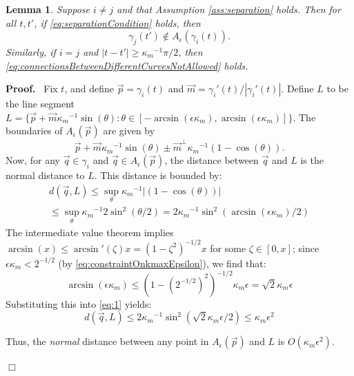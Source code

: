 \documentclass{article}
\newcommand{\nin}{\not\in}
\newenvironment{proof}{
  \noindent\textbf{Proof.}\ }{\hspace*{\fill}
  \begin{math}\Box\end{math}\medskip}
\newtheorem{lemma}[cntr]{Lemma}
\numberwithin{cntr}{section}
\numberwithin{equation}{section}
\newcommand{\abs}[1]{\left| #1 \right|}%
\newcommand{\vp}[0]{{\vec{p}}}
\newcommand{\vq}[0]{{\vec{q}}}
\newcommand{\vm}[0]{{\vec{m}}}
\newcommand{\allowed}[2]{ { A_{#1}(#2) } }
\newcommand{\curvemax}{{\kappa_{m}}}
\newcommand{\curvemaxi}{{\curvemax^{-1}}}
\begin{document}
\begin{lemma}
  \label{lem:separationAllowedRegions}
  Suppose $i \neq j$ and that Assumption \ref{ass:separation} holds.
Then for all $t, t'$, if \eqref{eq:separationCondition} holds, then
  \begin{equation}
    \label{eq:connectionsBetweenDifferentCurvesNotAllowed}
    \gamma_{j}(t')  \nin  \allowed{\epsilon}{\gamma_{i}(t)}.
  \end{equation}
  Similarly, if $i=j$ and $\abs{t-t'} \geq \curvemax^{-1} \pi/2$, then \eqref{eq:connectionsBetweenDifferentCurvesNotAllowed} holds.
\end{lemma}
\begin{proof}
  Fix $t$, and define $\vp=\gamma_{i}(t)$ and $\vm=\gamma_{i}'(t) / \abs{\gamma_{i}'(t)}$. Define $L$ to be the line segment $L= \{ \vp+\vm \curvemaxi \sin(\theta) : \theta \in [-\arcsin(\epsilon \curvemax),\arcsin(\epsilon \curvemax)] \}$. The boundaries of $\allowed{\epsilon}{\vp}$ are given by
\begin{equation*}
  \vp + \vm \curvemaxi \sin(\theta) \pm \vm^{\perp} \curvemaxi (1-\cos(\theta)).
\end{equation*}
Now, for any $\vq \in \gamma_{i} $ and $\vq \in \allowed{\epsilon}{\vp}$, the distance between $\vq$ and $L$ is the normal distance to $L$. This distance is bounded by:
\begin{multline}
  \label{eq:1}
  d(\vq,L) \leq
  \sup_{\theta} \curvemaxi \abs{(1-\cos(\theta)) }\\
  \leq
  \sup_{\theta} \curvemaxi 2 \sin^{2}(\theta/2) =
  2\curvemaxi \sin^{2}( \arcsin(\epsilon \curvemax)/2)
\end{multline}
The intermediate value theorem implies $\arcsin( x) \leq \arcsin'(\zeta) x=(1-\zeta^{2})^{-1/2} x$ for some $\zeta \in [0,x]$; since $\epsilon \curvemax < 2^{-1/2}$ (by \eqref{eq:constraintOnkmaxEpsilon}), we find that:
\begin{equation*}
  \arcsin(\epsilon \curvemax) \leq (1-(2^{-1/2})^{2})^{-1/2} \curvemax \epsilon = \sqrt{2} \curvemax \epsilon
\end{equation*}
Substituting this into \eqref{eq:1} yields:
\begin{equation}
  \label{eq:4}
  d(\vq,L) \leq
  2 \curvemaxi \sin^{2}( \sqrt{2} \curvemax \epsilon/2) \leq \curvemax \epsilon^{2}
\end{equation}

Thus, the \emph{normal} distance between any point in $\allowed{\epsilon}{\vp}$ and $L$ is $O(\curvemax \epsilon^{2})$.


\end{proof}
\end{document}
